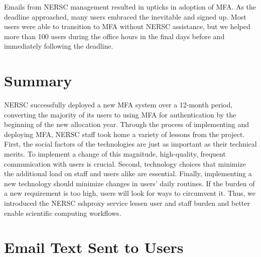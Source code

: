 \documentclass[sigconf,review]{acmart}
\begin{document}
Emails from NERSC management resulted in upticks in adoption of MFA. As the
deadline approached, many users embraced the inevitable and signed up. Most
users were able to transition to MFA without NERSC assistance, but we helped
more than 100 users during the office hours in the final days before and
immediately following the deadline.

\section{Summary}
\label{summary}

NERSC successfully deployed a new MFA system over a 12-month period, converting
the majority of its users to using MFA for authentication by the beginning of
the new allocation year. Through the process of implementing and deploying MFA,
NERSC staff took home a variety of lessons from the project. First, the social
factors of the technologies are just as important as their technical merits. To
implement a change of this magnitude, high-quality, frequent communication with
users is crucial. Second, technology choices that minimize the additional load
on staff and users alike are essential. Finally, implementing a new technology
should minimize changes in users' daily routines. If the burden of a new
requirement is too high, users will look for ways to circumvent it. Thus, we
introduced the NERSC sshproxy service lessen user and staff burden and better
enable scientific computing workflows.




\appendix

\section{Email Text Sent to Users}
\end{document}
